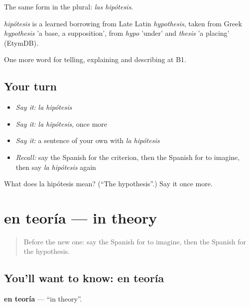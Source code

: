 The same form in the plural: \emph{las hipótesis}.

\begin{cousinweb}
\emph{hipótesis} is a learned borrowing from Late Latin \emph{hypothesis}, taken from Greek \emph{hypothesis} 'a base, a supposition', from \emph{hypo} 'under' and \emph{thesis} 'a placing' (EtymDB).
\end{cousinweb}

\begin{grammarlens}[title={What you've built}]
One more word for telling, explaining and describing at B1.
\end{grammarlens}

\subsection*{Your turn}
\begin{itemize}
\raggedright
  \item \emph{Say it:} \emph{la hipótesis}
  \item \emph{Say it:} \emph{la hipótesis}, once more
  \item \emph{Say it:} a sentence of your own with \emph{la hipótesis}
  \item \emph{Recall:} say the Spanish for the criterion, then the Spanish for to imagine, then say \emph{la hipótesis} again
\end{itemize}

\begin{tcolorbox}[breakable,colback=teal!4,colframe=teal!35!black,title={Before you move on}]
What does la hipótesis mean? (\textquotedblleft{}The hypothesis\textquotedblright{}.) Say it once more.
\end{tcolorbox}
\section[en teoría]{en teoría — in theory}

\label{lesson:ES-C618-en-teoria}



\begin{quote}
Before the new one: say the Spanish for to imagine, then the Spanish for the hypothesis.
\end{quote}

\subsection*{You'll want to know: en teoría}
\textbf{en teoría} — \textquotedblleft{}in theory\textquotedblright{}.

